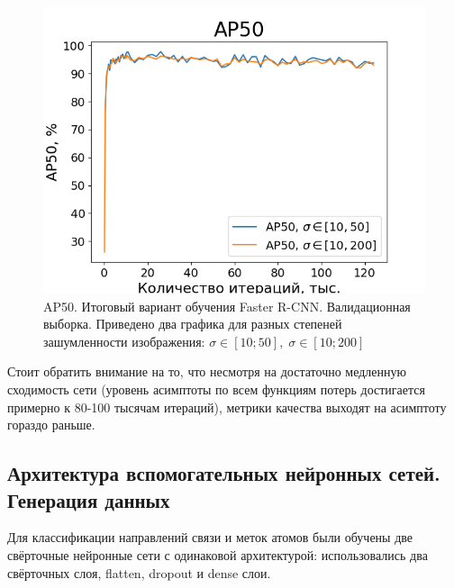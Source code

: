 \begin{figure}[ht!] 
	\center
	\includegraphics [scale=0.8] {my_folder/images/AP50_second}
	\caption{AP50. Итоговый вариант обучения Faster R-CNN. Валидационная выборка. Приведено два графика для разных степеней зашумленности изображения: $\sigma \in [10; 50], \; \sigma \in [10; 200]$}
	\label{fig:AP50_second}
\end{figure}

Стоит обратить внимание на то, что несмотря на достаточно медленную сходимость сети (уровень асимптоты по всем функциям потерь достигается примерно к 80-100 тысячам итераций), метрики качества выходят на асимптоту гораздо раньше.

\subsection{Архитектура вспомогательных нейронных сетей. Генерация данных} \label{ch2:sec3:arch}

Для классификации направлений связи и меток атомов были обучены две свёрточные нейронные сети с одинаковой архитектурой:
использовались два свёрточных слоя, flatten, dropout и dense слои.

